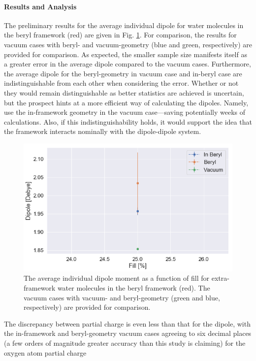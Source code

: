         \paragraph{Results and Analysis} The preliminary results for the average individual dipole for water molecules in the beryl framework (red) are given in Fig. \ref{fig:pc_beryl_pc}. For comparison, the results for vacuum cases with beryl- and vacuum-geometry (blue and green, respectively) are provided for comparison. As expected, the smaller sample size manifests itself as a greater error in the average dipole compared to the vacuum cases. Furthermore, the average dipole for the beryl-geometry in vacuum case and in-beryl case are indistinguishable from each other when considering the error. Whether or not they would remain distinguishable as better statistics are achieved is uncertain, but the prospect hints at a more efficient way of calculating the dipoles. Namely, use the in-framework geometry in the vacuum case---saving potentially weeks of calculations. Also, if this indistinguishability holds, it would support the idea that the framework interacts nominally with the dipole-dipole system.
        
        \begin{figure}
            \centering
            \includegraphics[width=0.9\linewidth]{Figures/System/pc_beryl_pc.png}
            \caption{The average individual dipole moment as a function of fill for extra-framework water molecules in the beryl framework (red). The vacuum cases with vacuum- and beryl-geometry (green and blue, respectively) are provided for comparison.}
            \label{fig:pc_beryl_pc}
        \end{figure}
        
        The discrepancy between partial charge is even less than that for the dipole, with the in-framework and beryl-geometry vacuum cases agreeing to six decimal places (a few orders of magnitude greater accuracy than this study is claiming) for the oxygen atom partial charge
        
